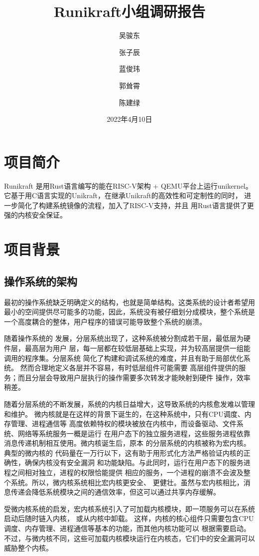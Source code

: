 \documentclass{../runikraft-report}
\renewcommand{\today}{2022年4月10日}
\begin{document}
\title{\bfseries Runikraft小组\quad 调研报告}
\author{吴骏东\and 张子辰\and 蓝俊玮\and 郭耸霄\and 陈建绿}
\date{\today}
\maketitle

\tableofcontents

\section{项目简介}
Runikraft 是用Rust语言编写的能在RISC-V架构 + QEMU平台上运行unikernel。
它基于用C语言实现的Unikraft，在继承Unikraft的高效性和可定制性的同时，
进一步简化了构建系统镜像的流程，加入了RISC-V支持，并且
用Rust语言提供了更强的内核安全保证。
\section{项目背景}
\subsection{操作系统的架构}
最初的操作系统缺乏明确定义的结构，也就是简单结构。这类系统的设计者希望用
最小的空间提供尽可能多的功能，因此，系统没有被仔细划分成模块，整个系统是
一个高度耦合的整体，用户程序的错误可能导致整个系统的崩溃。\cite{bib:os-concept}

随着操作系统的
发展，分层系统出现了，这种系统被分割成若干层，最低层为硬件层，最高层为用户
层，每一层都在较低层基础上实现，并为较高层提供一组能调用的程序集。分层系统
简化了构建和调试系统的难度，并且有助于局部优化系统。
然而合理地定义各层并不容易，有时低层组件可能需要
高层组件提供的服务；而且分层会导致用户层执行的操作需要多次转发才能映射到硬件
操作，效率稍差。

随着分层系统的不断发展，系统的内核日益增大，这导致系统的内核愈发难以管理和维护。
微内核就是在这样的背景下诞生的，在这种系统中，只有CPU调度、内存管理、进程通信等
高度依赖特权的模块被放在内核中，而设备驱动、文件系统、网络等系统服务一概是运行
在用户态下的独立服务进程，这些服务进程依靠消息传递机制相互使用。微内核诞生后，原本
的分层系统的内核被称为宏内核。典型的微内核的
代码量在一万行以下，这有助于用形式化方法严格验证内核的正确性，确保内核没有安全漏洞
和功能缺陷。与此同时，运行在用户态下的服务进程之间相对独立，进程的权限恰能提供
相应的服务，一个进程的崩溃不会波及整个系统。所以，微内核系统相比宏内核更安全、
更健壮。虽然与宏内核相比，消息传递会降低系统模块之间的通信效率，但这可以通过共享内存缓解。

受微内核系统的启发，宏内核系统引入了可加载内核模块，即一项服务可以在系统启动后随时链入内核，
或从内核中卸载。
这样，内核的核心组件只需要包含CPU调度、内存管理、进程通信等基本的功能，而其他内核功能可以
根据需要启动。不过，与微内核不同，这些可加载内核模块运行在内核态，它们中的安全漏洞可以
威胁整个内核。\cite{bib:os-concept}
\end{document}

